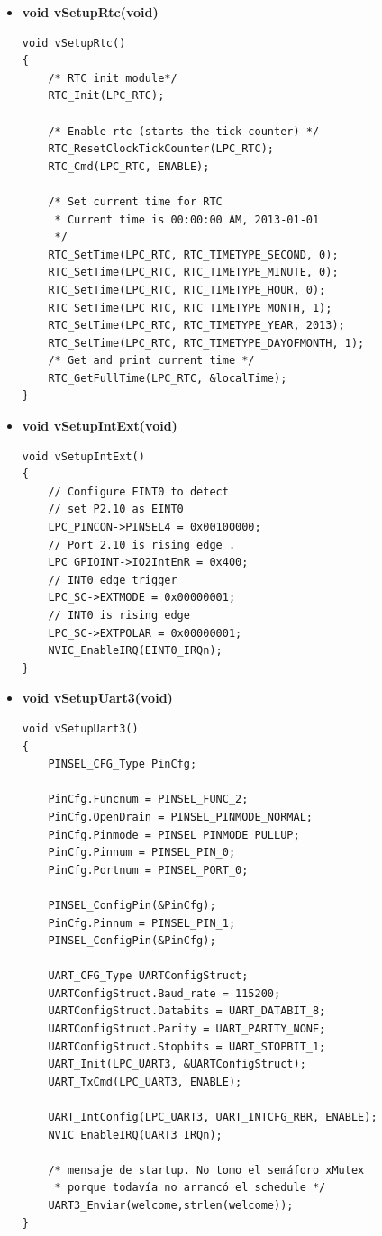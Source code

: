 \documentclass[a4paper,12pt]{article}
\begin{document}
\begin{itemize}

\item {\textbf{void vSetupRtc(void)}}

{\begin{verbatim}
void vSetupRtc()
{
	/* RTC init module*/
	RTC_Init(LPC_RTC);

	/* Enable rtc (starts the tick counter) */
	RTC_ResetClockTickCounter(LPC_RTC);
	RTC_Cmd(LPC_RTC, ENABLE);

	/* Set current time for RTC
	 * Current time is 00:00:00 AM, 2013-01-01
	 */
	RTC_SetTime(LPC_RTC, RTC_TIMETYPE_SECOND, 0);
	RTC_SetTime(LPC_RTC, RTC_TIMETYPE_MINUTE, 0);
	RTC_SetTime(LPC_RTC, RTC_TIMETYPE_HOUR, 0);
	RTC_SetTime(LPC_RTC, RTC_TIMETYPE_MONTH, 1);
	RTC_SetTime(LPC_RTC, RTC_TIMETYPE_YEAR, 2013);
	RTC_SetTime(LPC_RTC, RTC_TIMETYPE_DAYOFMONTH, 1);
	/* Get and print current time */
	RTC_GetFullTime(LPC_RTC, &localTime);
}
\end{verbatim}}

\item {\textbf{void vSetupIntExt(void)}}

\begin{verbatim}
void vSetupIntExt()
{
	// Configure EINT0 to detect
	// set P2.10 as EINT0
	LPC_PINCON->PINSEL4 = 0x00100000;
	// Port 2.10 is rising edge .
	LPC_GPIOINT->IO2IntEnR = 0x400;
	// INT0 edge trigger
	LPC_SC->EXTMODE = 0x00000001;
	// INT0 is rising edge
	LPC_SC->EXTPOLAR = 0x00000001;
	NVIC_EnableIRQ(EINT0_IRQn);
}
\end{verbatim}

\item {\textbf{void vSetupUart3(void)}}

\begin{verbatim}
void vSetupUart3()
{
	PINSEL_CFG_Type PinCfg;

	PinCfg.Funcnum = PINSEL_FUNC_2;
	PinCfg.OpenDrain = PINSEL_PINMODE_NORMAL;
	PinCfg.Pinmode = PINSEL_PINMODE_PULLUP;
	PinCfg.Pinnum = PINSEL_PIN_0;
	PinCfg.Portnum = PINSEL_PORT_0;

	PINSEL_ConfigPin(&PinCfg);
	PinCfg.Pinnum = PINSEL_PIN_1;
	PINSEL_ConfigPin(&PinCfg);

	UART_CFG_Type UARTConfigStruct;
	UARTConfigStruct.Baud_rate = 115200;
	UARTConfigStruct.Databits = UART_DATABIT_8;
	UARTConfigStruct.Parity = UART_PARITY_NONE;
	UARTConfigStruct.Stopbits = UART_STOPBIT_1;
	UART_Init(LPC_UART3, &UARTConfigStruct);
	UART_TxCmd(LPC_UART3, ENABLE);

	UART_IntConfig(LPC_UART3, UART_INTCFG_RBR, ENABLE);
	NVIC_EnableIRQ(UART3_IRQn);

	/* mensaje de startup. No tomo el semáforo xMutex
	 * porque todavía no arrancó el schedule */
	UART3_Enviar(welcome,strlen(welcome));
}
\end{verbatim}

\end{itemize}
\end{document}
